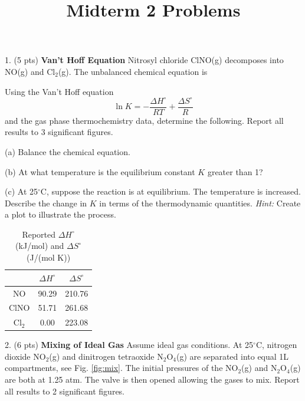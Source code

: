 \documentclass[11pt]{article}
\title{\textbf{Midterm 2 Problems}}
\begin{document}
\maketitle

1. (5 pts) \textbf{Van't Hoff Equation} Nitrosyl chloride ClNO(g) decomposes
into NO(g) and Cl$_2$(g). The unbalanced chemical equation is
\begin{center}
\end{center}
Using the Van't Hoff equation
\begin{equation}
  \ln K = -\frac{\Delta H^\circ}{RT} + \frac{\Delta S^\circ}{R}
  \label{eqn:van_hoff}
\end{equation}
and the gas phase thermochemistry data, determine the following. Report
all results to 3 significant figures.

(a) Balance the chemical equation.

(b) At what temperature is the equilibrium constant $K$ greater than 1?

(c) At 25$^\circ$C, suppose the reaction is at equilibrium. The temperature
is increased. Describe the change in $K$ in terms of the thermodynamic
quantities. \textit{Hint:} Create a plot to illustrate the process.

\begin{table}[hbpt]
  \caption{Reported $\Delta H^\circ$ (kJ/mol) and $\Delta S^\circ$ (J/(mol K))}
  \centering
  \begin{tabular}{c|cc}
    & $\Delta H^\circ$ & $\Delta S^\circ$ \\
    \hline
    NO        &  90.29 & 210.76 \\
    ClNO      &  51.71 & 261.68 \\
    Cl$_2$    &  0.00 & 223.08
  \end{tabular}
\end{table}

\pagebreak

2. (6 pts) \textbf{Mixing of Ideal Gas} Assume ideal gas conditions. At 25$^\circ$C,
nitrogen dioxide NO$_2$(g) and dinitrogen tetraoxide N$_2$O$_4$(g) are
separated into equal 1L compartments, see Fig. \ref{fig:mix}. The initial pressures of the
NO$_2$(g) and N$_2$O$_4$(g) are both at 1.25 atm. The valve is then opened allowing
the gases to mix. Report all results to 2 significant figures.
\end{document}
